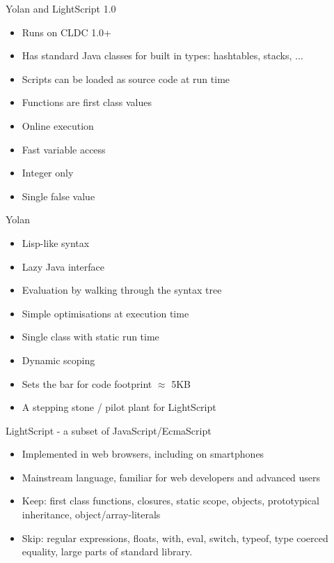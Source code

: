 \documentclass[a4paper,landscape]{slides}
\begin{document}
\begin{slide}
	{\large 
            Yolan and LightScript 1.0
	\\ \mbox{}}
	\begin{itemize} \addtolength{\itemsep}{-\baselineskip}
            \item Runs on CLDC 1.0+
            \item Has standard Java classes for built in types: hashtables, stacks, ...
            \item Scripts can be loaded as source code at run time
            \item Functions are first class values
            \item Online execution
            \item Fast variable access
            \item Integer only
            \item Single false value 
	\end{itemize}
\end{slide}

\begin{slide}
	{\large 
            Yolan 
	\\ \mbox{}}
	\begin{itemize} \addtolength{\itemsep}{-\baselineskip}
            \item Lisp-like syntax
            \item Lazy Java interface
            \item Evaluation by walking through the syntax tree
            \item Simple optimisations at execution time
            \item Single class with static run time
            \item Dynamic scoping
            \item Sets the bar for code footprint $\approx$ 5KB
            \item A stepping stone / pilot plant for LightScript
	\end{itemize}
\end{slide}

\begin{slide}
	{\large 
            LightScript - a subset of JavaScript/EcmaScript 
	\\ \mbox{}}
	\begin{itemize} \addtolength{\itemsep}{-\baselineskip}
            \item Implemented in web browsers, including on smartphones
            \item Mainstream language, familiar for web developers and advanced users
	\end{itemize}
	\begin{itemize} \addtolength{\itemsep}{-\baselineskip}
            \item Keep: first class functions, closures, static scope, objects, prototypical inheritance, object/array-literals
            \item Skip: regular expressions, floats, with, eval, switch, typeof, type coerced equality, large parts of standard library.
	\end{itemize}
\end{slide}
\end{document}
